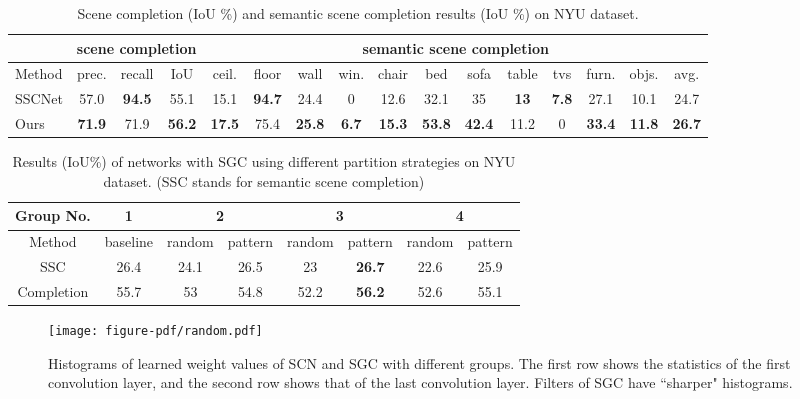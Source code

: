 \documentclass[runningheads]{llncs}
\begin{document}
\begin{table}[t]
\centering
\caption{Scene completion (IoU \%) and semantic scene completion results (IoU \%) on NYU dataset.}
\label{tab:nyu_baseline}
\resizebox{\textwidth}{!}
{\begin{tabular}{l|ccc|cccccccccccc}
\hline
            & \multicolumn{3}{c|}{scene completion}  & \multicolumn{12}{c}{semantic scene completion}                                                                                                                                        \\ \hline
Method       & prec.         & recall & IoU           & ceil.         & floor & wall          & win.          & chair         & bed           & sofa          & table         & tvs           & furn.         & objs.         & avg.          \\ \hline
SSCNet & 57.0        & \textbf{94.5}        & 55.1      & 15.1  & \textbf{94.7}  & 24.4 & 0    & 12.6  & 32.1 & 35   & \textbf{13}    & \textbf{7.8} & 27.1  & 10.1  & 24.7 \\ \hline
Ours       & \textbf{71.9}        & 71.9        & \textbf{56.2}      & \textbf{17.5}    & 75.4  & \textbf{25.8} & \textbf{6.7}    & \textbf{15.3}  & \textbf{53.8} & \textbf{42.4} & 11.2     & 0   & \textbf{33.4}  & \textbf{11.8}  & \textbf{26.7} \\ \hline
\end{tabular}
}
\end{table}

\begin{table}[t]
\centering
\caption{Results (IoU\%) of networks with SGC using different partition strategies on NYU dataset. (SSC stands for semantic scene completion)}
\label{tab:nyu_sgc}

\begin{tabular}{c|c|c|c|c|c|c|c}
\hline
Group No.    & 1        & \multicolumn{2}{c|}{2} & \multicolumn{2}{c|}{3} & \multicolumn{2}{c}{4} \\ \hline
Method       & baseline & random & pattern & random & pattern & random & pattern \\ \hline
SSC & 26.4     & 24.1   & 26.5          & 23     & \textbf{26.7} & 22.6   & 25.9          \\ \hline
Completion   & 55.7     & 53     & 54.8          & 52.2   & \textbf{56.2} & 52.6   & 55.1          \\ \hline
\end{tabular}

\end{table}
\begin{figure}[t]
\centering
\texttt{[image: figure-pdf/random.pdf]}
\caption{Histograms of learned weight values of SCN and SGC with different groups. The first row shows the statistics of the first convolution layer, and the second row shows that of the last convolution layer. Filters of SGC have ``sharper" histograms.}
\label{fig:weight_visual}
\end{figure}
\end{document}
